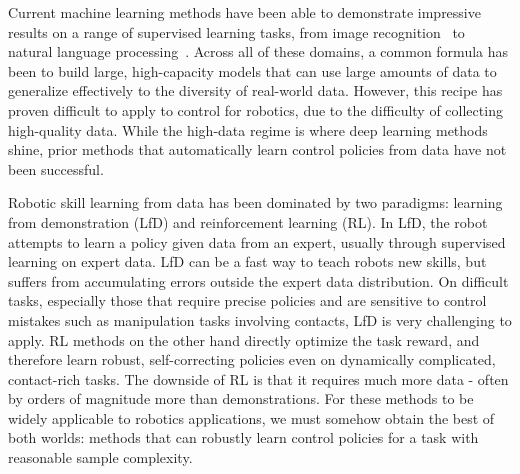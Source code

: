 






Current machine learning methods have been able to demonstrate impressive results on a range of supervised learning tasks, from image recognition~\citep{krizhevsky2012imagenet} to natural language processing~\citep{vaswani2017transformers}. 
Across all of these domains, a common formula has been to build large, high-capacity models that can use large amounts of data to generalize effectively to the diversity of real-world data.
However, this recipe has proven difficult to apply to control for robotics, due to the difficulty of collecting high-quality data.
While the high-data regime is where deep learning methods shine, prior methods that automatically learn control policies from data have not been successful.

Robotic skill learning from data has been dominated by two paradigms: learning from demonstration (LfD) and reinforcement learning (RL). 
In LfD, the robot attempts to learn a policy given data from an expert, usually through supervised learning on expert data. 
LfD can be a fast way to teach robots new skills, but suffers from accumulating errors outside the expert data distribution. 
On difficult tasks, especially those that require precise policies and are sensitive to control mistakes such as manipulation tasks involving contacts, LfD is very challenging to apply.
RL methods on the other hand directly optimize the task reward, and therefore learn robust, self-correcting policies even on dynamically complicated, contact-rich tasks.
The downside of RL is that it requires much more data - often by orders of magnitude more than demonstrations. 
For these methods to be widely applicable to robotics applications, we must somehow obtain the best of both worlds: methods that can robustly learn control policies for a task with reasonable sample complexity.

